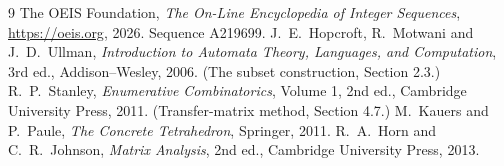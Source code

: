 \documentclass[11pt,a4paper]{article}
\theoremstyle{plain}
\theoremstyle{definition}
\begin{document}
\begin{thebibliography}{9}
 The OEIS Foundation, \emph{The On-Line Encyclopedia of Integer
Sequences}, \url{https://oeis.org}, 2026. Sequence A219699.
 J.~E.~Hopcroft, R.~Motwani and J.~D.~Ullman, \emph{Introduction to Automata
Theory, Languages, and Computation}, 3rd ed., Addison--Wesley, 2006. (The subset
construction, Section 2.3.)
 R.~P.~Stanley, \emph{Enumerative Combinatorics}, Volume 1, 2nd ed.,
Cambridge University Press, 2011. (Transfer-matrix method, Section 4.7.)
 M.~Kauers and P.~Paule, \emph{The Concrete Tetrahedron}, Springer, 2011.
 R.~A.~Horn and C.~R.~Johnson, \emph{Matrix Analysis}, 2nd ed., Cambridge
University Press, 2013.
\end{thebibliography}
\end{document}
